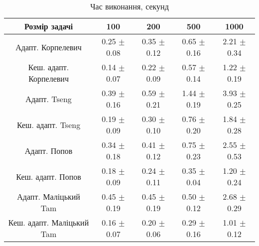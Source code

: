 \begin{table}[H]
	\centering
	\begin{tabular}{|c||c|c|c|c|}\hline
		Розмір задачі & 100 & 200 & 500 & 1000 \\ \hline \hline
		Адапт. Корпелевич & 0.25 $\pm$ 0.08 & 0.35 $\pm$ 0.12 & 0.65 $\pm$ 0.16 & 2.21 $\pm$ 0.34 \\ \hline
		Кеш. адапт. Корпелевич & 0.14 $\pm$ 0.07 & 0.22 $\pm$ 0.09 & 0.57 $\pm$ 0.14 & 1.22 $\pm$ 0.19 \\ \hline
		Адапт. Tseng & 0.39 $\pm$ 0.16 & 0.59 $\pm$ 0.21 & 1.44 $\pm$ 0.19 & 3.93 $\pm$ 0.25 \\ \hline
		Кеш. адапт. Tseng & 0.19 $\pm$ 0.09 & 0.30 $\pm$ 0.10 & 0.76 $\pm$ 0.20 & 1.84 $\pm$ 0.28 \\ \hline
		Адапт. Попов & 0.34 $\pm$ 0.18 & 0.41 $\pm$ 0.12 & 0.75 $\pm$ 0.23 & 2.55 $\pm$ 0.53 \\ \hline
		Кеш. адапт. Попов & 0.18 $\pm$ 0.09 & 0.24 $\pm$ 0.11 & 0.35 $\pm$ 0.04 & 1.20 $\pm$ 0.24 \\ \hline
		Адапт. Маліцький Tam & 0.45 $\pm$ 0.19 & 0.45 $\pm$ 0.19 & 0.50 $\pm$ 0.12 & 2.68 $\pm$ 0.29 \\ \hline
		Кеш. адапт. Маліцький Tam & 0.16 $\pm$ 0.07 & 0.20 $\pm$ 0.06 & 0.29 $\pm$ 0.16 & 1.01 $\pm$ 0.12 \\ \hline
	\end{tabular}
	\caption{Час виконання, секунд}
\end{table}
